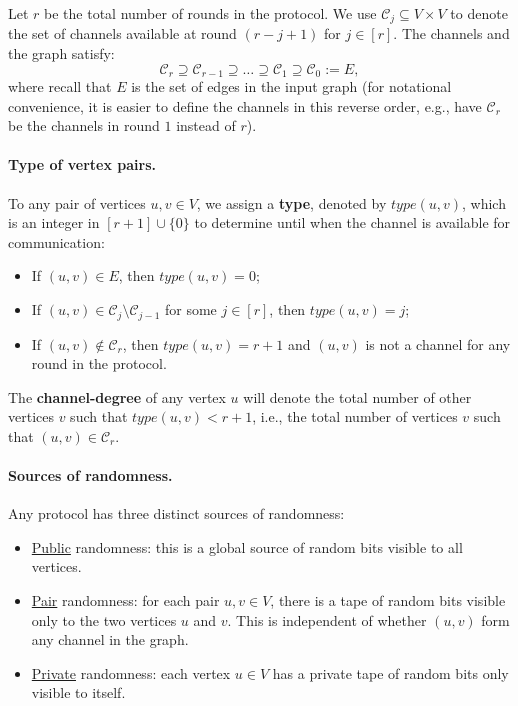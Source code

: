 \documentclass[11pt]{article}
\theoremstyle{definition}
\newcommand{\cC}{\ensuremath{\mathcal{C}}}
\newcommand{\typeval}[1]{\ensuremath{type(#1)}}
\begin{document}
Let $r$ be the total number of rounds in the protocol. 
We use $\cC_j \subseteq V \times V$ to denote the set of channels available at round $(r-j+1)$ for $j \in [r]$. The channels and the graph satisfy: 
\[
	\cC_{r} \supseteq \cC_{r-1} \supseteq \ldots \supseteq \cC_1  \supseteq \cC_0 :=  E,
\]
where recall that $E$ is the set of edges in the input graph (for notational convenience, it is easier to define the channels in this reverse order, e.g., have $\cC_{r}$ be the channels in round $1$ instead of $r$). 

\paragraph{Type of vertex pairs.}
To any pair of vertices $u,v \in V$, we assign a \textbf{type}, denoted by $type(u,v)$, which is an integer in $[r+1] \cup \{0\}$ to determine until when the channel is available for communication: %
\begin{itemize}
	\item If $(u, v) \in E$, then $type(u,v) = 0$; 
	\item If $(u, v) \in \cC_j \setminus \cC_{j-1}$ for some $j \in [r]$, then $type(u,v) = j$;
	\item If $(u, v) \notin \cC_r$, then $type(u,v) = r+1$ and $(u, v)$ is not a channel for any round in the protocol. 
\end{itemize}

The \textbf{channel-degree} of any vertex $u$ will denote the total number of other vertices $v$ such that $\typeval{u, v} < r+1$, i.e., the total number of vertices $v$ such that $(u, v) \in \cC_r$. 


\paragraph{Sources of randomness.}
Any protocol has three distinct sources of randomness:

\begin{itemize}
	\item \underline{Public} randomness: this is a global source of random bits visible to all vertices. 
	\item \underline{Pair} randomness: for each pair $u,v \in V$, there is a tape of random bits visible only to the two vertices $u$ and $v$.  This is independent of whether $(u,v)$ form any channel in the graph. 
	\item \underline{Private} randomness: each vertex $u \in V$ has a private tape of random bits only visible to itself. 
\end{itemize}
\end{document}
